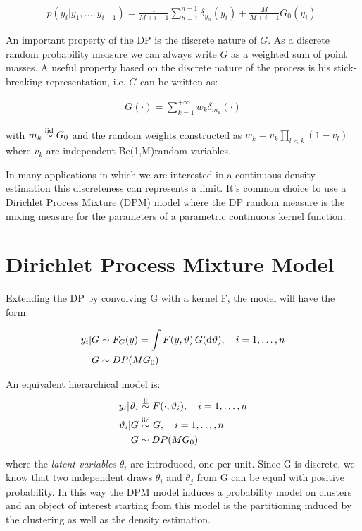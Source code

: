 \begin{align}
	p(y_i|y_1,...,y_{i-1})= \frac{1}{M+i-1}\sum_{h=1}^{n-1} \delta_{y_h}(y_i) +\frac{M}{M+i-1} G_0(y_i).
\end{align}

An important property of the DP is the discrete nature of $G$. As a discrete
random probability measure we can always write $G$ as a weighted sum of point masses.
A useful  property based on the discrete nature of the process is his stick-breaking representation, i.e. $G$ can be written as:

\begin{align}
 G(\cdot) = \sum_{k=1}^{+\infty} w_k \delta_{m_k} (\cdot)
 \end{align}
 
 with $m_k \stackrel{\text{iid}}{\sim} G_0$ and the random weights constructed as $w_k =v_k\prod\limits_{l<k} (1-v_l)$ where $v_k$ are independent Be(1,M)random variables.




In many applications in which we are interested in a continuous density estimation this discreteness can represents a limit.
 It's common choice to use a Dirichlet Process Mixture (DPM) model where  the DP random measure is the mixing measure for the parameters of a parametric continuous kernel function.


\section{Dirichlet Process Mixture Model}

Extending the DP by convolving G with a kernel F, the model will have the form:

\begin{align*}
			y_i | G &\sim F_G(y) = \int F(y,\vartheta) \, G(\mathrm d\vartheta), \quad i=1,\dots,n \\
			G &\sim DP(M G_0)
\end{align*}


An equivalent hierarchical model is:
\begin{align*}
			y_i | \theta_i &\indsim F(\cdot,\theta_i), \quad i=1,\dots,n \\
			\theta_i | G &\iidsim G, \quad i=1,\dots,n \\ 
			G &\sim DP(M G_0)
\end{align*}

where the \textit{latent variables} $\theta_i$ are introduced, one per unit. Since G is discrete, we know that two independent draws $\theta_i$ and $\theta_j$ from G can be equal with positive probability. In this way the DPM model induces a probability model on clusters and an object of interest starting from this model is the partitioning induced by the clustering as well as the density estimation. 


